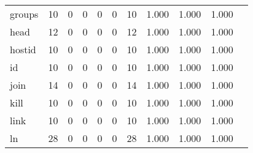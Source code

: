 \begin{longtable}{lp{1.10cm}p{1.10cm}p{1.10cm}p{1.10cm}p{1.10cm}p{1.10cm}p{1.10cm}p{1.10cm}p{1.10cm}p{1.10cm}}
groups    &                     10 &                                  0 &                                 0 &                                0 &                                 0 &                              10 &                          1.000 &                                 1.000 &                               1.000 \\
head      &                     12 &                                  0 &                                 0 &                                0 &                                 0 &                              12 &                          1.000 &                                 1.000 &                               1.000 \\
hostid    &                     10 &                                  0 &                                 0 &                                0 &                                 0 &                              10 &                          1.000 &                                 1.000 &                               1.000 \\
id        &                     10 &                                  0 &                                 0 &                                0 &                                 0 &                              10 &                          1.000 &                                 1.000 &                               1.000 \\
join      &                     14 &                                  0 &                                 0 &                                0 &                                 0 &                              14 &                          1.000 &                                 1.000 &                               1.000 \\
kill      &                     10 &                                  0 &                                 0 &                                0 &                                 0 &                              10 &                          1.000 &                                 1.000 &                               1.000 \\
link      &                     10 &                                  0 &                                 0 &                                0 &                                 0 &                              10 &                          1.000 &                                 1.000 &                               1.000 \\
ln        &                     28 &                                  0 &                                 0 &                                0 &                                 0 &                              28 &                          1.000 &                                 1.000 &                               1.000 \\

\end{longtable}
